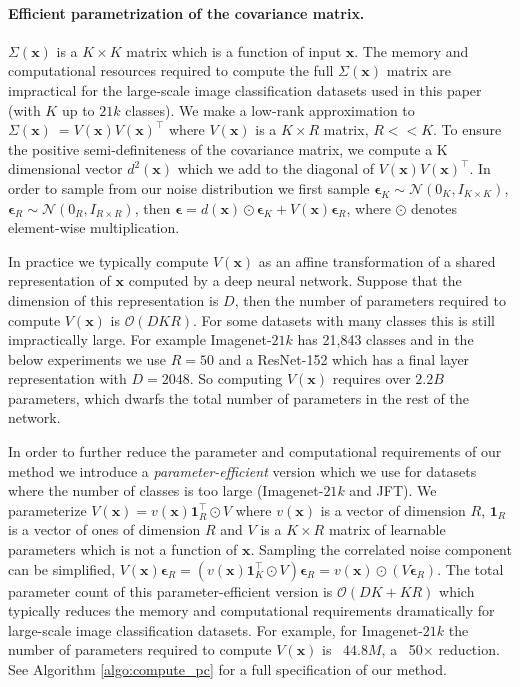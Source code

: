 \documentclass[final]{cvpr}
\begin{document}
\paragraph{Efficient parametrization of the covariance matrix.}
$\Sigma(\mathbf{x})$ is a $K \times K$ matrix which is a function of input $\mathbf{x}$. The memory and computational resources required to compute the full $\Sigma(\mathbf{x})$ matrix are impractical for the large-scale image classification datasets used in this paper (with $K$ up to $21k$ classes). We make a low-rank approximation to $\Sigma(\mathbf{x}) ~= V(\mathbf{x}) V(\mathbf{x})^\intercal$ where $V(\mathbf{x})$ is a $K \times R$ matrix, $R << K$. To ensure the positive semi-definiteness of the covariance matrix, we compute a K dimensional vector $d^2(\mathbf{x})$ which we add to the diagonal of $V(\mathbf{x}) V(\mathbf{x})^\intercal$. In order to sample from our noise distribution we first sample $\boldsymbol{\epsilon}_K \sim \mathcal{N}(0_K, I_{K\times K})$,
$\boldsymbol{\epsilon}_R \sim \mathcal{N}(0_R, I_{R\times R})$, then $\boldsymbol{\epsilon} = d(\mathbf{x}) \odot \boldsymbol{\epsilon}_K + V(\mathbf{x}) \boldsymbol{\epsilon}_R$, where $\odot$ denotes element-wise multiplication.

In practice we typically compute $V(\mathbf{x})$ as an affine transformation of a shared representation of $\mathbf{x}$ computed by a deep neural network. Suppose that the dimension of this representation is $D$, then the number of parameters required to compute $V(\mathbf{x})$ is $\mathcal{O}(DKR)$. For some datasets with many classes this is still impractically large. For example Imagenet-$21k$ has 21,843 classes and in the below experiments we use $R = 50$ and a ResNet-152 which has a final layer representation with $D = 2048$. So computing $V(\mathbf{x})$ requires over $2.2B$ parameters, which dwarfs the total number of parameters in the rest of the network.

In order to further reduce the parameter and computational requirements of our method we introduce a \emph{parameter-efficient} version which we use for datasets where the number of classes is too large (Imagenet-$21k$ and JFT). We parameterize $V(\mathbf{x}) = v(\mathbf{x}) \mathbf{1}_R^\intercal \odot V$ where $v(\mathbf{x})$ is a vector of dimension $R$, $\mathbf{1}_R$ is a vector of ones of dimension $R$ and $V$ is a $K \times R$ matrix of learnable parameters which is not a function of $\mathbf{x}$. Sampling the correlated noise component can be simplified, $V(\mathbf{x}) \boldsymbol{\epsilon}_R = (v(\mathbf{x}) \mathbf{1}_K^\intercal \odot V) \boldsymbol{\epsilon}_R = v(\mathbf{x}) \odot (V \boldsymbol{\epsilon}_R)$. The total parameter count of this parameter-efficient version is $\mathcal{O}(DK + KR)$ which typically reduces the memory and computational requirements dramatically for large-scale image classification datasets. For example, for Imagenet-$21k$ the number of parameters required to compute $V(\mathbf{x})$ is ~$44.8M$, a ~50$\times$ reduction. See Algorithm \ref{algo:compute_pc} for a full specification of our method.
\end{document}
